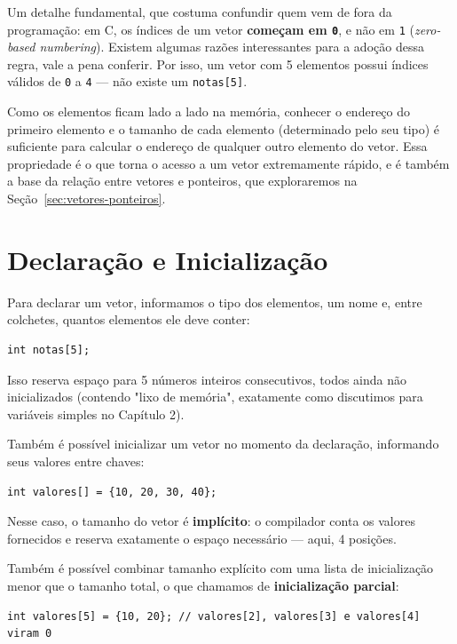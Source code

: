 \documentclass[12pt,a4paper,oneside]{extreport}
\begin{document}
Um detalhe fundamental, que costuma confundir quem vem de fora da programação: em C, os índices de um vetor \textbf{começam em \texttt{0}}, e não em \texttt{1} (\textit{zero-based numbering}). Existem algumas razões interessantes para a adoção dessa regra, vale a pena conferir. Por isso, um vetor com 5 elementos possui índices válidos de \texttt{0} a \texttt{4} — não existe um \texttt{notas[5]}.

Como os elementos ficam lado a lado na memória, conhecer o endereço do primeiro elemento e o tamanho de cada elemento (determinado pelo seu tipo) é suficiente para calcular o endereço de qualquer outro elemento do vetor. Essa propriedade é o que torna o acesso a um vetor extremamente rápido, e é também a base da relação entre vetores e ponteiros, que exploraremos na Seção~\ref{sec:vetores-ponteiros}.

\section{Declaração e Inicialização}

Para declarar um vetor, informamos o tipo dos elementos, um nome e, entre colchetes, quantos elementos ele deve conter:

\begin{lstlisting}
int notas[5];
\end{lstlisting}

Isso reserva espaço para 5 números inteiros consecutivos, todos ainda não inicializados (contendo "lixo de memória", exatamente como discutimos para variáveis simples no Capítulo 2).

Também é possível inicializar um vetor no momento da declaração, informando seus valores entre chaves:

\begin{lstlisting}
int valores[] = {10, 20, 30, 40};
\end{lstlisting}

Nesse caso, o tamanho do vetor é \textbf{implícito}: o compilador conta os valores fornecidos e reserva exatamente o espaço necessário — aqui, 4 posições.

Também é possível combinar tamanho explícito com uma lista de inicialização menor que o tamanho total, o que chamamos de \textbf{inicialização parcial}:

\begin{lstlisting}
int valores[5] = {10, 20}; // valores[2], valores[3] e valores[4] viram 0
\end{lstlisting}
\end{document}
